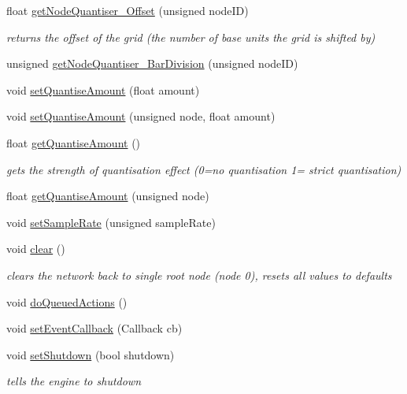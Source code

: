 \begin{DoxyCompactItemize}
float \mbox{\hyperlink{classMatsuokaEngine_a05ab0eeb8a7d0b7f3a478ba41735cb8d}{get\+Node\+Quantiser\+\_\+\+Offset}} (unsigned node\+ID)
\begin{DoxyCompactList}\small\item\em returns the offset of the grid (the number of base units the grid is shifted by) \end{DoxyCompactList}\item 
unsigned \mbox{\hyperlink{classMatsuokaEngine_af7edec268c651be3a45061cf9e90c123}{get\+Node\+Quantiser\+\_\+\+Bar\+Division}} (unsigned node\+ID)
\item 
void \mbox{\hyperlink{classMatsuokaEngine_a9057153267968489cd83ca31a1fbd985}{set\+Quantise\+Amount}} (float amount)
\item 
void \mbox{\hyperlink{classMatsuokaEngine_ae053fd0bdd438fa8a7f4cbd151122f89}{set\+Quantise\+Amount}} (unsigned node, float amount)
\item 
float \mbox{\hyperlink{classMatsuokaEngine_aaf73c32f2c81d4895e98e1a8fe31cea1}{get\+Quantise\+Amount}} ()
\begin{DoxyCompactList}\small\item\em gets the strength of quantisation effect (0=no quantisation 1= strict quantisation) \end{DoxyCompactList}\item 
float \mbox{\hyperlink{classMatsuokaEngine_a8150c0efacb8f3d5ec2c3fb5731dfc97}{get\+Quantise\+Amount}} (unsigned node)
\item 
void \mbox{\hyperlink{classMatsuokaEngine_a23ee17f0e948af6fcccdaeefa2c4e246}{set\+Sample\+Rate}} (unsigned sample\+Rate)
\item 
void \mbox{\hyperlink{classMatsuokaEngine_a3bf65a238e682b78fee81cd13b49174d}{clear}} ()
\begin{DoxyCompactList}\small\item\em clears the network back to single root node (node 0), resets all values to defaults \end{DoxyCompactList}\item 
void \mbox{\hyperlink{classMatsuokaEngine_affd6ef89f68c1aa654229a07e0160f2e}{do\+Queued\+Actions}} ()
\item 
void \mbox{\hyperlink{classMatsuokaEngine_acaa099b8d5f49430d0fc84c16e0f4e67}{set\+Event\+Callback}} (Callback cb)
\item 
void \mbox{\hyperlink{classMatsuokaEngine_afca77a2464c5852a0dbb9eed2d191ecb}{set\+Shutdown}} (bool shutdown)
\begin{DoxyCompactList}\small\item\em tells the engine to shutdown \end{DoxyCompactList}\item 

\end{DoxyCompactItemize}
